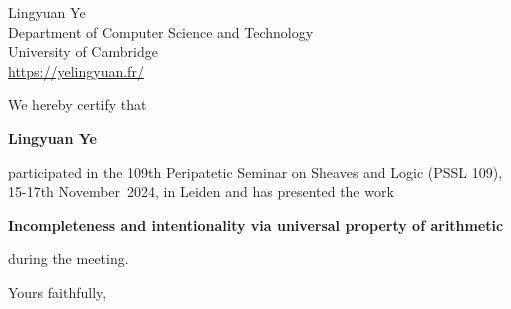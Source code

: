 \documentclass[
  fontsize=11pt,
  paper=a4,
  parskip=half,
  enlargefirstpage=on,    %
  fromalign=right,        %
  fromlogo=on,
  fromrule=off,     %
  addrfield=on,           %
  backaddress=off,         %
  subject=beforeopening,  %
  locfield=off,        %
  foldmarks=off,           %
  pagenumber=off
]{scrlttr2}
\begin{document}
\begin{letter}{%
    Lingyuan Ye \\
    Department of Computer Science and Technology \\
    University of Cambridge \\
    \url{https://yelingyuan.fr/}
  }
  \opening{}

  We hereby certify that
  \begin{center}
    \textbf{Lingyuan Ye}
  \end{center}
  participated in the 109th Peripatetic Seminar on Sheaves and Logic
  (PSSL 109), 15-17th November~2024, in Leiden and has 
  presented the work
  \begin{center}
    \textbf{Incompleteness and intentionality via universal property of arithmetic}
  \end{center}
  during the meeting.

\vfill
\closing{Yours faithfully,}
\end{letter}
\end{document}
